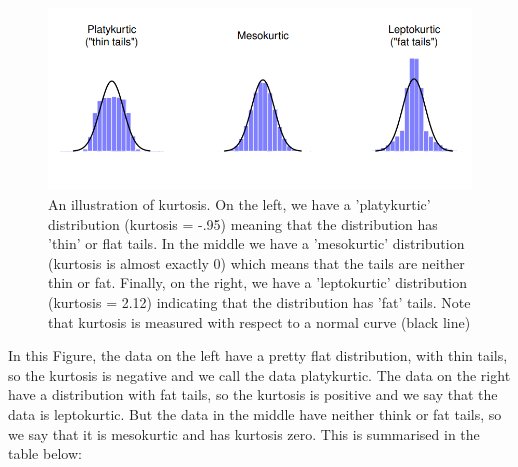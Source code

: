 \documentclass[
]{book}
\begin{document}
\begin{figure}
\includegraphics[width=0.9\linewidth]{images/Figure19} \caption{An illustration of kurtosis. On the left, we have a 'platykurtic' distribution (kurtosis = -.95) meaning that the distribution has 'thin' or flat tails. In the middle we have a 'mesokurtic' distribution (kurtosis is almost exactly 0) which means that the tails are neither thin or fat. Finally, on the right, we have a 'leptokurtic' distribution (kurtosis = 2.12) indicating that the distribution has 'fat' tails. Note that kurtosis is measured with respect to a normal curve (black line)}\label{fig:fig4-12}
\end{figure}

In this Figure, the data on the left have a pretty flat distribution, with thin tails, so the kurtosis is negative and we call the data platykurtic. The data on the right have a distribution with fat tails, so the kurtosis is positive and we say that the data is leptokurtic. But the data in the middle have neither think or fat tails, so we say that it is mesokurtic and has kurtosis zero. This is summarised in the table below:

 
  \providecommand{\huxb}[2]{\arrayrulecolor[RGB]{#1}\global\arrayrulewidth=#2pt}
  \providecommand{\huxvb}[2]{\color[RGB]{#1}\vrule width #2pt}
  \providecommand{\huxtpad}[1]{\rule{0pt}{#1}}
  \providecommand{\huxbpad}[1]{\rule[-#1]{0pt}{#1}}
\end{document}
